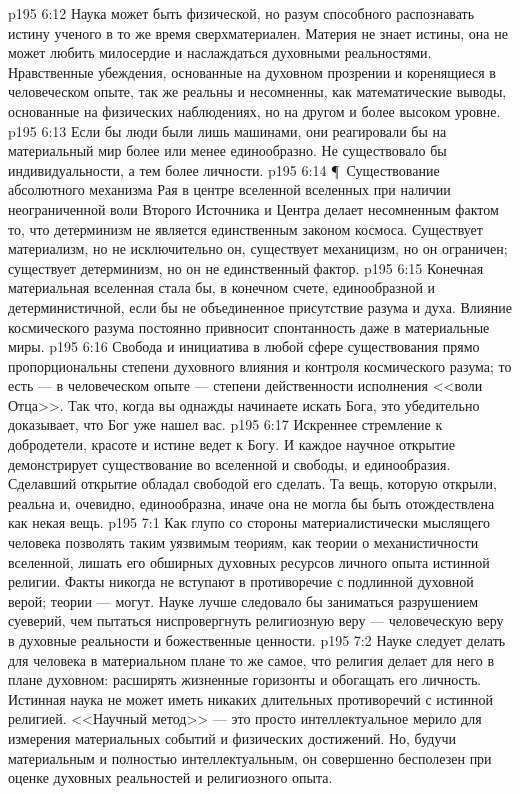 \vs p195 6:12 Наука может быть физической, но разум способного распознавать истину ученого в то же время сверхматериален. Материя не знает истины, она не может любить милосердие и наслаждаться духовными реальностями. Нравственные убеждения, основанные на духовном прозрении и коренящиеся в человеческом опыте, так же реальны и несомненны, как математические выводы, основанные на физических наблюдениях, но на другом и более высоком уровне.
\vs p195 6:13 Если бы люди были лишь машинами, они реагировали бы на материальный мир более или менее единообразно. Не существовало бы индивидуальности, а тем более личности.
\vs p195 6:14 \P\ Существование абсолютного механизма Рая в центре вселенной вселенных при наличии неограниченной воли Второго Источника и Центра делает несомненным фактом то, что детерминизм не является единственным законом космоса. Существует материализм, но не исключительно он, существует механицизм, но он ограничен; существует детерминизм, но он не единственный фактор.
\vs p195 6:15 Конечная материальная вселенная стала бы, в конечном счете, единообразной и детерминистичной, если бы не объединенное присутствие разума и духа. Влияние космического разума постоянно привносит спонтанность даже в материальные миры.
\vs p195 6:16 Свобода и инициатива в любой сфере существования прямо пропорциональны степени духовного влияния и контроля космического разума; то есть --- в человеческом опыте --- степени действенности исполнения <<воли Отца>>. Так что, когда вы однажды начинаете искать Бога, это убедительно доказывает, что Бог уже нашел вас.
\vs p195 6:17 Искреннее стремление к добродетели, красоте и истине ведет к Богу. И каждое научное открытие демонстрирует существование во вселенной и свободы, и единообразия. Сделавший открытие обладал свободой его сделать. Та вещь, которую открыли, реальна и, очевидно, единообразна, иначе она не могла бы быть отождествлена как некая вещь.
\vs p195 7:1 Как глупо со стороны материалистически мыслящего человека позволять таким уязвимым теориям, как теории о механистичности вселенной, лишать его обширных духовных ресурсов личного опыта истинной религии. Факты никогда не вступают в противоречие с подлинной духовной верой; теории --- могут. Науке лучше следовало бы заниматься разрушением суеверий, чем пытаться ниспровергнуть религиозную веру --- человеческую веру в духовные реальности и божественные ценности.
\vs p195 7:2 Науке следует делать для человека в материальном плане то же самое, что религия делает для него в плане духовном: расширять жизненные горизонты и обогащать его личность. Истинная наука не может иметь никаких длительных противоречий с истинной религией. <<Научный метод>> --- это просто интеллектуальное мерило для измерения материальных событий и физических достижений. Но, будучи материальным и полностью интеллектуальным, он совершенно бесполезен при оценке духовных реальностей и религиозного опыта.
